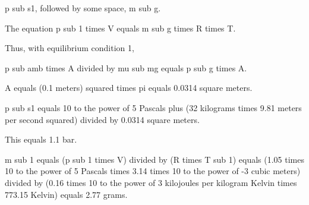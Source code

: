 p sub s1, followed by some space, m sub g.

The equation p sub 1 times V equals m sub g times R times T.

Thus, with equilibrium condition 1,

p sub amb times A divided by mu sub mg equals p sub g times A.

A equals (0.1 meters) squared times pi equals 0.0314 square meters.

p sub s1 equals 10 to the power of 5 Pascals plus (32 kilograms times 9.81 meters per second squared) divided by 0.0314 square meters.

This equals 1.1 bar.

m sub 1 equals (p sub 1 times V) divided by (R times T sub 1) equals (1.05 times 10 to the power of 5 Pascals times 3.14 times 10 to the power of -3 cubic meters) divided by (0.16 times 10 to the power of 3 kilojoules per kilogram Kelvin times 773.15 Kelvin) equals 2.77 grams.
